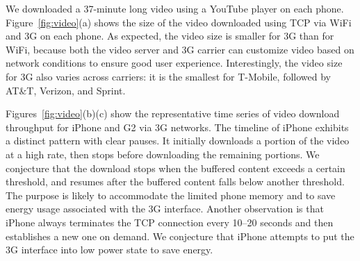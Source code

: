 
\label{sec:video}

We downloaded a 37-minute long video using a YouTube player on 
each phone. Figure~\ref{fig:video}(a) shows the size of the video
downloaded using TCP via WiFi and 3G on each phone. As expected, 
the video size is smaller for 3G than for WiFi, because both the 
video server and 3G carrier can customize video based on network 
conditions to ensure good user experience. Interestingly, the video 
size for 3G also varies across carriers: it is the smallest for 
T-Mobile, followed by AT\&T, Verizon, and Sprint. 

Figures~\ref{fig:video}(b)(c) show the representative time series 
of video download throughput for iPhone and G2 via 3G networks.
The timeline of iPhone exhibits a distinct pattern with clear pauses. 
It initially downloads a portion of the video at a high rate, then 
stops before downloading the remaining portions. We conjecture that 
the download stops when the buffered content exceeds a certain 
threshold, and resumes after the buffered content falls below another 
threshold. The purpose is likely to accommodate the limited phone
memory and to save energy usage associated with the 3G interface. 
Another observation is that iPhone always terminates the TCP 
connection every 10--20 seconds and then establishes a new one on 
demand. We conjecture that iPhone attempts to put the 3G 
interface into low power state to save energy. 

